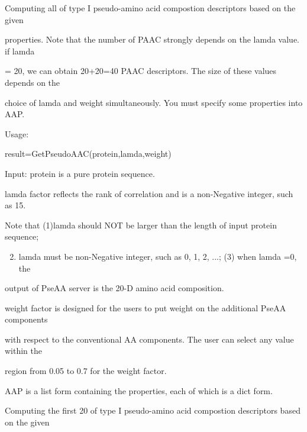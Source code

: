 \documentclass[letterpaper,10pt,english]{sphinxmanual}
\begin{document}
\begin{fulllineitems}
\label{reference/PseudoAAC:PseudoAAC.GetPseudoAAC}
Computing all of type I pseudo-amino acid compostion descriptors based on the given

properties. Note that the number of PAAC strongly depends on the lamda value. if lamda

= 20, we can obtain 20+20=40 PAAC descriptors. The size of these values depends on the

choice of lamda and weight simultaneously. You must specify some properties into AAP.

Usage:

result=GetPseudoAAC(protein,lamda,weight)

Input: protein is a pure protein sequence.

lamda factor reflects the rank of correlation and is a non-Negative integer, such as 15.

Note that (1)lamda should NOT be larger than the length of input protein sequence;
\begin{enumerate}
\setcounter{enumi}{1}
\item {} 
lamda must be non-Negative integer, such as 0, 1, 2, ...; (3) when lamda =0, the

\end{enumerate}

output of PseAA server is the 20-D amino acid composition.

weight factor is designed for the users to put weight on the additional PseAA components

with respect to the conventional AA components. The user can select any value within the

region from 0.05 to 0.7 for the weight factor.

AAP is a list form containing the properties, each of which is a dict form.

\end{fulllineitems}


\begin{fulllineitems}
\label{reference/PseudoAAC:PseudoAAC.GetPseudoAAC1}
Computing the first 20 of type I pseudo-amino acid compostion descriptors based on the given

\end{fulllineitems}
\end{document}
